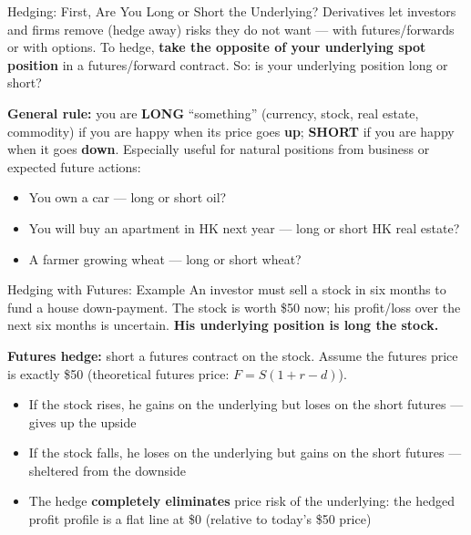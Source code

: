 \documentclass[aspectratio=169]{beamer}
\begin{document}
\begin{frame}{Hedging: First, Are You Long or Short the Underlying?}
Derivatives let investors and firms remove (hedge away) risks they do not want --- with futures/forwards or with options. To hedge, \textbf{take the opposite of your underlying spot position} in a futures/forward contract. So: is your underlying position long or short?
\vspace{0.3em}

\textbf{General rule:} you are \textbf{LONG} ``something'' (currency, stock, real estate, commodity) if you are happy when its price goes \textbf{up}; \textbf{SHORT} if you are happy when it goes \textbf{down}. Especially useful for natural positions from business or expected future actions:
\begin{itemize}
  \item You own a car --- long or short oil?
  \item You will buy an apartment in HK next year --- long or short HK real estate?
  \item A farmer growing wheat --- long or short wheat?
\end{itemize}
\end{frame}

\begin{frame}{Hedging with Futures: Example}
An investor must sell a stock in six months to fund a house down-payment. The stock is worth \$50 now; his profit/loss over the next six months is uncertain. \textbf{His underlying position is long the stock.}
\vspace{0.3em}

\textbf{Futures hedge:} short a futures contract on the stock. Assume the futures price is exactly \$50 (theoretical futures price: $F = S(1+r-d)$).
\begin{itemize}
  \item If the stock rises, he gains on the underlying but loses on the short futures --- gives up the upside
  \item If the stock falls, he loses on the underlying but gains on the short futures --- sheltered from the downside
  \item The hedge \textbf{completely eliminates} price risk of the underlying: the hedged profit profile is a flat line at \$0 (relative to today's \$50 price)
\end{itemize}
\end{frame}
\end{document}
